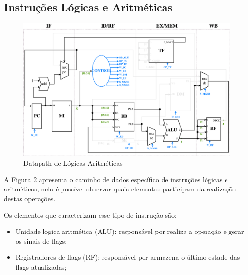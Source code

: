 \documentclass{report}
\begin{document}
\subsection{Instruções Lógicas e Aritméticas}
\begin{figure}[H]
\centering
\includegraphics[width=\textwidth]{./pictures/DatapathLA.pdf}
\caption{Datapath de Lógicas Aritméticas}
\end{figure}

A Figura 2 apresenta o caminho de dados específico de instruções lógicas e aritméticas, nela é possível observar quais elementos participam da realização destas operações.\newline

Os elementos que caracterizam esse tipo de instrução são: 
\begin{itemize}
    \item Unidade logica aritmética (ALU): responsável por realiza a operação e gerar os sinais de flags;
    \item Registradores de flags (RF): responsável por armazena o último estado das flags atualizadas;
\end{itemize}
 
\end{document}
